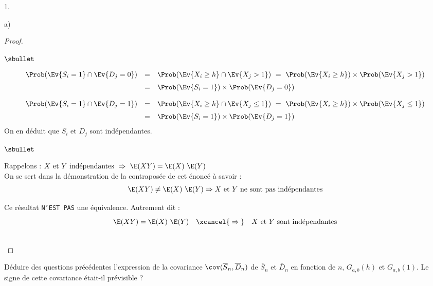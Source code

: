 \documentclass[11pt]{article}%
\begin{document}
\begin{noliste}{1.}
\begin{noliste}{a)}
\begin{proof}
\begin{noliste}{$\sbullet$}
        
        \newpage
        
        
        \[
          \begin{array}{rcl}
            \Prob(\Ev{S_i = 1} \cap \Ev{D_j = 0}) & = & \Prob(\Ev{X_i 
	    \geq h} \cap \Ev{X_j > 1}) \ = \ \Prob(\Ev{X_i \geq h}) 
	    \times \Prob(\Ev{X_j > 1}) 
	    \\[.2cm]
	    &=& \Prob(\Ev{S_i=1}) \times \Prob(\Ev{D_j=0})
          \end{array}
        \]
        
        \[
          \begin{array}{rcl}
            \Prob(\Ev{S_i = 1} \cap \Ev{D_j = 1}) & = & \Prob(\Ev{X_i 
	    \geq h} \cap \Ev{X_j \leq 1}) \ = \ \Prob(\Ev{X_i \geq h}) 
	    \times \Prob(\Ev{X_j \leq 1})
	    \\[.2cm]
	    &=& \Prob(\Ev{S_i=1}) \times \Prob(\Ev{D_j=1})
          \end{array}
        \]
        On en déduit que $S_i$ et $D_j$ sont indépendantes.
      \end{noliste}
        
      \begin{remark}%
        \begin{noliste}{$\sbullet$}
        \item Rappelons :
          $
          \mbox{$X$ et $Y$ indépendantes} \ \Rightarrow \ \E(XY) =
          \E(X) \ \E(Y)
          $\\
          On se sert dans la démonstration de la contraposée de cet
          énoncé à savoir : 
          \[
          \E(XY) \neq \E(X) \ \E(Y) \Rightarrow \mbox{$X$ et $Y$ ne
            sont pas indépendantes}
          \]
        \item Ce résultat {\tt N'EST PAS} une équivalence. Autrement
          dit :
          \[
          \E(XY) = \E(X) \ \E(Y) \quad \xcancel{\rule[-.15cm]{0cm}{.5cm}
            \Rightarrow \rule[-.15cm]{0cm}{.5cm}} \quad \mbox{$X$ et
            $Y$ sont indépendantes}
          \]
        \end{noliste}
      \end{remark}~\\[-1.4cm]
    \end{proof}

  \item Déduire des questions précédentes l'expression de la
    covariance $\cov(\overline{S}_n, \overline{D}_n)$ de
    $\overline{S}_n$ et $\overline{D}_n$ en fonction de $n$,
    $G_{a,b}(h)$ et $G_{a,b}(1)$. Le signe de cette covariance
    était-il prévisible ?


\end{noliste}
\end{noliste}
\end{document}
